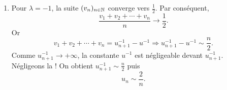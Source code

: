 \begin{enumerate}
\item  Pour $\lambda =-1$, la suite $(v_{n})_{n\in \mathbb{N}}$ converge vers $\frac{1}{2}$. Par cons{\'e}quent,
\[\frac{v_{1}+v_{2}+\cdots +v_{n}}{n} \rightarrow \frac{1}{2}.\]
Or
\begin{displaymath}
 v_{1}+v_{2}+\cdots +v_{n}=u_{n+1}^{-1}-u^{-1}
\Rightarrow
u_{n+1}^{-1}-u^{-1}\sim \frac{n}{2}.
\end{displaymath}
Comme $u_{n+1}^{-1}\rightarrow +\infty $, la constante $u^{-1}$ est n{\'e}gligeable devant $u_{n+1}^{-1}$. N{\'e}gligeons la ! On obtient $u_{n+1}^{-1}\sim \frac{n}{2}$ puis
\[
u_{n}\sim \frac{2}{n}.
\]
\end{enumerate}
